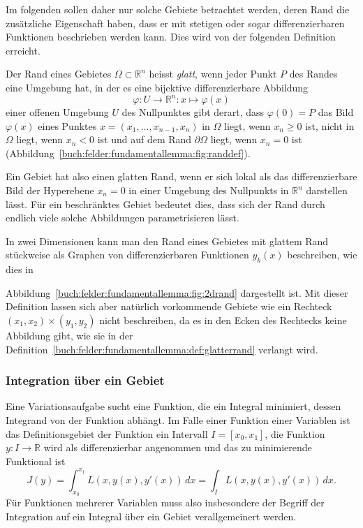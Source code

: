 Im folgenden sollen daher nur solche Gebiete betrachtet werden,
deren Rand die zusätzliche Eigenschaft haben, dass er mit stetigen
oder sogar differenzierbaren Funktionen beschrieben werden kann.
Dies wird von der folgenden Definition erreicht.


\begin{definition}
\label{buch:felder:fundamentallemma:def:glatterrand}
Der Rand eines Gebietes $\Omega\subset\mathbb{R}^n$ heisst {\em glatt},
wenn jeder Punkt $P$ des Randes eine Umgebung hat, in der es eine bijektive
differenzierbare Abbildung
\[
\varphi
\colon
U\to \mathbb{R}^n 
:
x\mapsto \varphi(x)
\]
einer offenen Umgebung $U$ des Nullpunktes gibt derart, dass $\varphi(0)=P$
das Bild $\varphi(x)$ eines Punktes $x=(x_1,\dots,x_{n-1},x_n)$ in $\Omega$
liegt, wenn $x_n\ge 0$ ist, nicht in $\Omega$ liegt, wenn $x_n<0$ ist und auf
dem Rand $\partial\Omega$ liegt, wenn $x_n=0$ ist
(Abbildung~\ref{buch:felder:fundamentallemma:fig:randdef}).
\end{definition}

Ein Gebiet hat also einen glatten Rand, wenn er sich lokal als das
differenzierbare Bild der Hyperebene $x_n=0$ in einer Umgebung des
Nullpunkts in $\mathbb{R}^n$ darstellen lässt.
Für ein beschränktes Gebiet bedeutet dies, dass sich der Rand durch
endlich viele solche Abbildungen parametrisieren lässt.

In zwei Dimensionen kann man den Rand eines Gebietes mit
glattem Rand stückweise als Graphen von differenzierbaren Funktionen
$y_k(x)$ beschreiben, wie dies in

Abbildung~\ref{buch:felder:fundamentallemma:fig:2drand}
dargestellt ist.
Mit dieser Definition lassen sich aber natürlich vorkommende Gebiete
wie ein Rechteck $(x_1,x_2)\times(y_1,y_2)$ nicht beschreiben, da
es in den Ecken des Rechtecks keine Abbildung gibt, wie sie in der
Definition~\ref{buch:felder:fundamentallemma:def:glatterrand}
verlangt wird.

%
%
\subsubsection{Integration über ein Gebiet}
Eine Variationsaufgabe sucht eine Funktion, die ein Integral minimiert,
dessen Integrand von der Funktion abhängt.
Im Falle einer Funktion einer Variablen ist das Definitionsgebiet der
Funktion ein Intervall $I=[x_0,x_1]$, die Funktion $y\colon I\to\mathbb{R}$
wird als differenzierbar angenommen und das zu minimierende Funktional
ist
\[
J(y)
=
\int_{x_0}^{x_1} L(x,y(x),y'(x))\,dx
=
\int_I L(x,y(x),y'(x))\,dx.
\]
Für Funktionen mehrerer Variablen muss also insbesondere der Begriff
der Integration auf ein Integral über ein Gebiet verallgemeinert werden.


